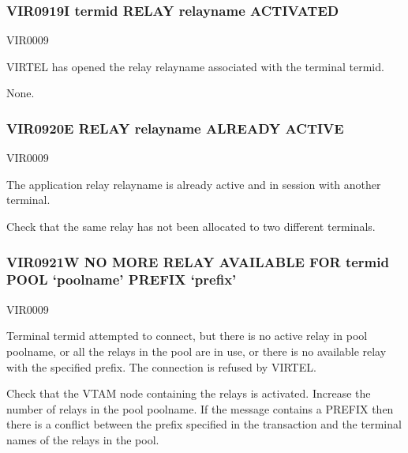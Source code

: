 \documentclass[letterpaper,10pt,english]{sphinxmanual}
\begin{document}
\subsubsection{VIR0919I termid RELAY relayname ACTIVATED}
\label{\detokenize{messages:vir0919i-termid-relay-relayname-activated}}\begin{description}
\sphinxAtStartPar
VIR0009

\sphinxAtStartPar
VIRTEL has opened the relay relayname associated with the terminal termid.

\sphinxAtStartPar
None.

\end{description}


\subsubsection{VIR0920E RELAY relayname ALREADY ACTIVE}
\label{\detokenize{messages:vir0920e-relay-relayname-already-active}}\begin{description}
\sphinxAtStartPar
VIR0009

\sphinxAtStartPar
The application relay relayname is already active and in session with another terminal.

\sphinxAtStartPar
Check that the same relay has not been allocated to two different terminals.

\end{description}


\subsubsection{VIR0921W NO MORE RELAY AVAILABLE FOR termid POOL ‘poolname’ PREFIX ‘prefix’}
\label{\detokenize{messages:vir0921w-no-more-relay-available-for-termid-pool-poolname-prefix-prefix}}\begin{description}
\sphinxAtStartPar
VIR0009

\sphinxAtStartPar
Terminal termid attempted to connect, but there is no active relay in pool poolname, or all the relays in the pool are in use, or there is no available relay with the specified prefix. The connection is refused by VIRTEL.

\sphinxAtStartPar
Check that the VTAM node containing the relays is activated. Increase the number of relays in the pool poolname.  If the message contains a PREFIX then there is a conflict between the prefix specified in the transaction and the terminal names of the relays in the pool.

\end{description}
\end{document}
